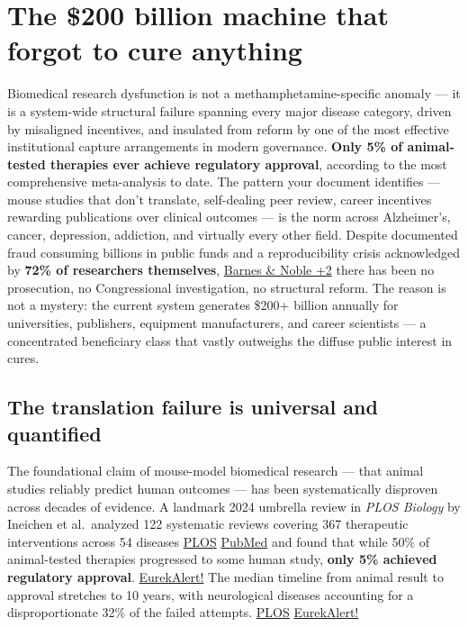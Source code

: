 ﻿\section{The \$200 billion machine that forgot to cure anything}\label{19_200_billion-the-200-billion-machine-that-forgot-to-cure-anything}

Biomedical research dysfunction is not a methamphetamine-specific anomaly --- it is a system-wide structural failure spanning every major disease category, driven by misaligned incentives, and insulated from reform by one of the most effective institutional capture arrangements in modern governance. \textbf{Only 5\% of animal-tested therapies ever achieve regulatory approval}, according to the most comprehensive meta-analysis to date. The pattern your document identifies --- mouse studies that don't translate, self-dealing peer review, career incentives rewarding publications over clinical outcomes --- is the norm across Alzheimer's, cancer, depression, addiction, and virtually every other field. Despite documented fraud consuming billions in public funds and a reproducibility crisis acknowledged by \textbf{72\% of researchers themselves}, \href{https://www.barnesandnoble.com/w/rigor-mortis-richard-f-harris/1124804938}{Barnes \& Noble +2} there has been no prosecution, no Congressional investigation, no structural reform. The reason is not a mystery: the current system generates \$200+ billion annually for universities, publishers, equipment manufacturers, and career scientists --- a concentrated beneficiary class that vastly outweighs the diffuse public interest in cures.

\subsection{The translation failure is universal and quantified}\label{19_200_billion-the-translation-failure-is-universal-and-quantified}

The foundational claim of mouse-model biomedical research --- that animal studies reliably predict human outcomes --- has been systematically disproven across decades of evidence. A landmark 2024 umbrella review in \emph{PLOS Biology} by Ineichen et al.~analyzed 122 systematic reviews covering 367 therapeutic interventions across 54 diseases \href{https://journals.plos.org/plosbiology/article?id=10.1371/journal.pbio.3002667}{PLOS} \href{https://pubmed.ncbi.nlm.nih.gov/38870090/}{PubMed} and found that while 50\% of animal-tested therapies progressed to some human study, \textbf{only 5\% achieved regulatory approval}. \href{https://www.eurekalert.org/news-releases/1046892}{EurekAlert!} The median timeline from animal result to approval stretches to 10 years, with neurological diseases accounting for a disproportionate 32\% of the failed attempts. \href{https://journals.plos.org/plosbiology/article?id=10.1371/journal.pbio.3002667}{PLOS} \href{https://www.eurekalert.org/news-releases/1046892}{EurekAlert!}

